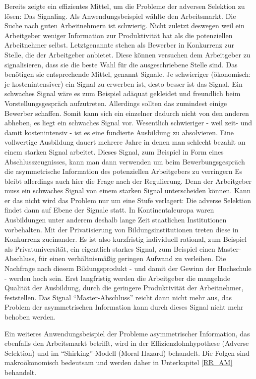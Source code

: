 Bereits \textcite{Spence1973} zeigte ein effizientes Mittel, um die Probleme der adversen Selektion zu lösen: Das Signaling. Als Anwendungsbeispiel wählte \textcite{Spence1973} den Arbeitsmarkt. Die Suche nach guten Arbeitnehmern ist schwierig. Nicht zuletzt deswegen weil ein Arbeitgeber weniger Information zur Produktivität hat als die potenziellen Arbeitnehmer selbst. Letztgenannte stehen als Bewerber in Konkurrenz zur Stelle, die der Arbeitgeber anbietet. Diese können versuchen dem Arbeitgeber zu signalisieren, dass sie die beste Wahl für die ausgeschriebene Stelle sind. Das benötigen sie entsprechende Mittel, genannt Signale. Je schwieriger (ökonomisch: je kostenintensiver) ein Signal zu erwerben ist, desto besser ist das Signal. Ein schwaches Signal wäre es zum Beispiel adäquat gekleidet und freundlich beim Vorstellungsgespräch aufzutreten. Allerdings sollten das zumindest einige Bewerber schaffen. Somit kann sich ein einzelner dadurch nicht von den anderen abheben, es liegt ein schwaches Signal vor. Wesentlich schwieriger - weil zeit- und damit kostenintensiv - ist es eine fundierte Ausbildung zu absolvieren. Eine vollwertige Ausbildung dauert mehrere Jahre in denen man schlecht bezahlt an einem starken Signal arbeitet. Dieses Signal, zum Beispiel in Form eines Abschlusszeugnisses, kann man dann verwenden um beim Bewerbungsgespräch die asymmetrische Information des potenziellen Arbeitgebers zu verringern \parencite{Spence1973}
Es bleibt allerdings auch hier die Frage nach der Regulierung. Denn der Arbeitgeber muss ein schwaches Signal von einem starken Signal unterscheiden können. Kann er das nicht wird das Problem nur um eine Stufe verlagert: Die adverse Selektion findet dann auf Ebene der Signale statt. In Kontinentaleuropa waren Ausbildungen unter anderem deshalb lange Zeit staatlichen Institutionen vorbehalten. Mit der Privatisierung von Bildungsinstitutionen treten diese in Konkurrenz zueinander. Es ist also kurzfristig individuell rational, zum Beispiel als Privatuniversität, ein eigentlich starkes Signal, zum Beispiel einen Master-Abschluss, für einen verhältnismäßig geringen Aufwand zu verleihen. Die Nachfrage nach diesem Bildungsprodukt - und damit der Gewinn der Hochschule - werden hoch sein. Erst langfristig werden die Arbeitgeber die mangelnde Qualität der Ausbildung, durch die geringere Produktivität der Arbeitnehmer, feststellen. Das Signal "`Master-Abschluss"' reicht dann nicht mehr aus, das Problem der asymmetrischen Information kann durch dieses Signal nicht mehr behoben werden.

Ein weiteres Anwendungsbeispiel der Probleme asymmetrischer Information, das ebenfalls den Arbeitsmarkt betrifft, wird in der Effizienzlohnhypothese (Adverse Selektion) und im "`Shirking"'-Modell (Moral Hazard) behandelt. Die Folgen sind makroökonomisch bedeutsam und werden daher in Unterkapitel \ref{RR_AM} behandelt.

